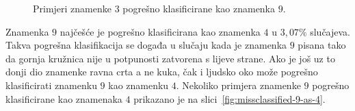 \begin{figure}[htb]
    \centering
    \caption{Primjeri znamenke $3$ pogrešno klasificirane kao znamenka $9$.}
    \label{fig:missclassified-3-as-9}
\end{figure}
Znamenka $9$ najčešće je pogrešno klasificirana kao znamenka $4$ u $3,07\%$ slučajeva. Takva pogrešna klasifikacija se
događa u slučaju kada je znamenka $9$ pisana tako da gornja kružnica nije u potpunosti zatvorena s lijeve strane.
Ako je još uz to donji dio znamenke ravna crta a ne kuka, čak i ljudsko oko može pogrešno klasificirati znamenku $9$
kao znamenku $4$. Nekoliko primjera znamenke $9$ pogrešno klasificirane kao znamenaka $4$ prikazano je na
slici\ \ref{fig:missclassified-9-as-4}.
